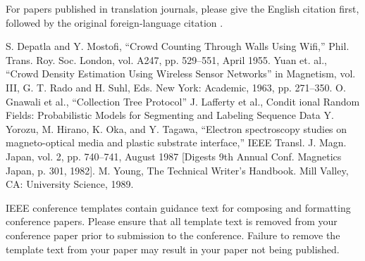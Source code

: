 \documentclass[conference]{IEEEtran}
\begin{document}
For papers published in translation journals, please give the English 
citation first, followed by the original foreign-language citation \cite{b6}.

\begin{thebibliography}{00}
 S. Depatla and Y. Mostofi, ``Crowd Counting Through Walls Using Wifi,'' Phil. Trans. Roy. Soc. London, vol. A247, pp. 529--551, April 1955.
 Yuan et. al., ``Crowd Density Estimation Using Wireless Sensor Networks'' in Magnetism, vol. III, G. T. Rado and H. Suhl, Eds. New York: Academic, 1963, pp. 271--350.
 O. Gnawali et al., ``Collection Tree Protocol''
 J. Lafferty et al., Condit
ional Random Fields: Probabilistic Models for Segmenting and Labeling Sequence Data
 Y. Yorozu, M. Hirano, K. Oka, and Y. Tagawa, ``Electron spectroscopy studies on magneto-optical media and plastic substrate interface,'' IEEE Transl. J. Magn. Japan, vol. 2, pp. 740--741, August 1987 [Digests 9th Annual Conf. Magnetics Japan, p. 301, 1982].
 M. Young, The Technical Writer's Handbook. Mill Valley, CA: University Science, 1989.
\end{thebibliography}
\vspace{12pt}
\color{red}
IEEE conference templates contain guidance text for composing and formatting conference papers. Please ensure that all template text is removed from your conference paper prior to submission to the conference. Failure to remove the template text from your paper may result in your paper not being published.
\end{document}
